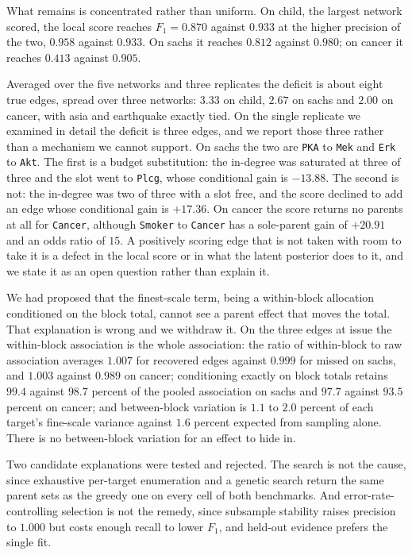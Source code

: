 What remains is concentrated rather than uniform. On child, the largest network
scored, the local score reaches $F_1 = 0.870$ against $0.933$ at the higher
precision of the two, $0.958$ against $0.933$. On sachs it reaches $0.812$
against $0.980$; on cancer it reaches $0.413$ against $0.905$.

Averaged over the five networks and three replicates the deficit is about eight
true edges, spread over three networks: $3.33$ on child, $2.67$ on sachs and
$2.00$ on cancer, with asia and earthquake exactly tied. On the single
replicate we examined in detail the deficit is three edges, and we report those
three rather than a mechanism we cannot support. On sachs the two are
\texttt{PKA} to \texttt{Mek} and \texttt{Erk} to \texttt{Akt}. The first is a
budget substitution: the in-degree was saturated at three of three and the slot
went to \texttt{Plcg}, whose conditional gain is $-13.88$. The second is not:
the in-degree was two of three with a slot free, and the score declined to add
an edge whose conditional gain is $+17.36$. On cancer the score returns no
parents at all for \texttt{Cancer}, although \texttt{Smoker} to \texttt{Cancer}
has a sole-parent gain of $+20.91$ and an odds ratio of $15$. A positively
scoring edge that is not taken with room to take it is a defect in the local
score or in what the latent posterior does to it, and we state it as an open
question rather than explain it.

We had proposed that the finest-scale term, being a within-block allocation
conditioned on the block total, cannot see a parent effect that moves the total.
That explanation is wrong and we withdraw it. On the three edges at issue the
within-block association is the whole association: the ratio of within-block to
raw association averages $1.007$ for recovered edges against $0.999$ for missed
on sachs, and $1.003$ against $0.989$ on cancer; conditioning exactly on block
totals retains $99.4$ against $98.7$ percent of the pooled association on sachs
and $97.7$ against $93.5$ percent on cancer; and between-block variation is
$1.1$ to $2.0$ percent of each target's fine-scale variance against $1.6$
percent expected from sampling alone. There is no between-block variation for
an effect to hide in.

Two candidate explanations were tested and rejected. The search is not the
cause, since exhaustive per-target enumeration and a genetic search return the
same parent sets as the greedy one on every cell of both benchmarks. And
error-rate-controlling selection is not the remedy, since subsample stability
raises precision to $1.000$ but costs enough recall to lower $F_1$, and held-out
evidence prefers the single fit.


